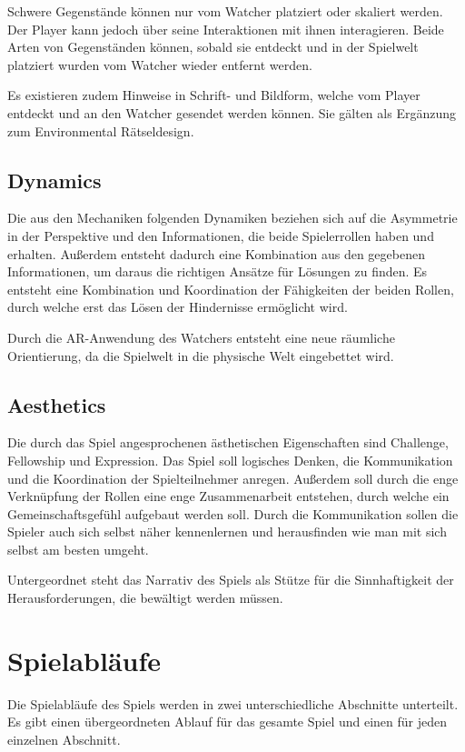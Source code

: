 Schwere Gegenstände können nur vom Watcher platziert oder skaliert werden. Der Player kann jedoch über seine Interaktionen mit ihnen interagieren. Beide Arten von Gegenständen können, sobald sie entdeckt und in der Spielwelt platziert wurden vom Watcher wieder entfernt werden.

Es existieren zudem Hinweise in Schrift- und Bildform, welche vom Player entdeckt und an den Watcher gesendet werden können. Sie gälten als Ergänzung zum Environmental Rätseldesign.

\subsection{Dynamics}
Die aus den Mechaniken folgenden Dynamiken beziehen sich auf die Asymmetrie in der Perspektive und den Informationen, die beide Spielerrollen haben und erhalten. Außerdem entsteht dadurch eine Kombination aus den gegebenen Informationen, um daraus die richtigen Ansätze für Lösungen zu finden. 
Es entsteht eine Kombination und Koordination der Fähigkeiten der beiden Rollen, durch welche erst das Lösen der Hindernisse ermöglicht wird.

Durch die AR-Anwendung des Watchers entsteht eine neue räumliche Orientierung, da die Spielwelt in die physische Welt eingebettet wird.


\subsection{Aesthetics}
Die durch das Spiel angesprochenen ästhetischen Eigenschaften sind Challenge, Fellowship und Expression. Das Spiel soll logisches Denken, die Kommunikation und die Koordination der Spielteilnehmer anregen. Außerdem soll durch die enge Verknüpfung der Rollen eine enge Zusammenarbeit entstehen, durch welche ein Gemeinschaftsgefühl aufgebaut werden soll. Durch die Kommunikation sollen die Spieler auch sich selbst näher kennenlernen und herausfinden wie man mit sich selbst am besten umgeht.

Untergeordnet steht das Narrativ des Spiels als Stütze für die Sinnhaftigkeit der Herausforderungen, die bewältigt werden müssen.


\section{Spielabläufe}
Die Spielabläufe des Spiels werden in zwei unterschiedliche Abschnitte unterteilt. Es gibt einen übergeordneten Ablauf für das gesamte Spiel und einen für jeden einzelnen Abschnitt.

